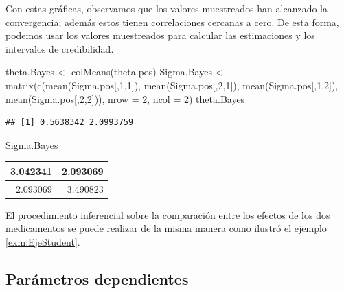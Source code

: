 \documentclass[
  10pt,
  spanish,
]{book}
\newenvironment{Shaded}{\begin{snugshade}}{\end{snugshade}}
\newcommand{\AttributeTok}[1]{\textcolor[rgb]{0.77,0.63,0.00}{#1}}
\newcommand{\DecValTok}[1]{\textcolor[rgb]{0.00,0.00,0.81}{#1}}
\newcommand{\FunctionTok}[1]{\textcolor[rgb]{0.00,0.00,0.00}{#1}}
\newcommand{\NormalTok}[1]{#1}
\newcommand{\OtherTok}[1]{\textcolor[rgb]{0.56,0.35,0.01}{#1}}
\theoremstyle{definition}
\theoremstyle{definition}
\theoremstyle{definition}
\theoremstyle{definition}
\theoremstyle{remark}
\begin{document}
Con estas gráficas, observamos que los valores muestreados han alcanzado la convergencia; además estos tienen correlaciones cercanas a cero. De esta forma, podemos usar los valores muestreados para calcular las estimaciones y los intervalos de credibilidad.

\begin{Shaded}
\begin{Highlighting}[]
\NormalTok{theta.Bayes }\OtherTok{\textless{}{-}} \FunctionTok{colMeans}\NormalTok{(theta.pos)}
\NormalTok{Sigma.Bayes }\OtherTok{\textless{}{-}} \FunctionTok{matrix}\NormalTok{(}\FunctionTok{c}\NormalTok{(}\FunctionTok{mean}\NormalTok{(Sigma.pos[,}\DecValTok{1}\NormalTok{,}\DecValTok{1}\NormalTok{]),}
                        \FunctionTok{mean}\NormalTok{(Sigma.pos[,}\DecValTok{2}\NormalTok{,}\DecValTok{1}\NormalTok{]),}
                        \FunctionTok{mean}\NormalTok{(Sigma.pos[,}\DecValTok{1}\NormalTok{,}\DecValTok{2}\NormalTok{]),}
                        \FunctionTok{mean}\NormalTok{(Sigma.pos[,}\DecValTok{2}\NormalTok{,}\DecValTok{2}\NormalTok{])),}
                      \AttributeTok{nrow =} \DecValTok{2}\NormalTok{, }\AttributeTok{ncol =} \DecValTok{2}\NormalTok{)}
\NormalTok{theta.Bayes}
\end{Highlighting}
\end{Shaded}

\begin{verbatim}
## [1] 0.5638342 2.0993759
\end{verbatim}

\begin{Shaded}
\begin{Highlighting}[]
\NormalTok{Sigma.Bayes}
\end{Highlighting}
\end{Shaded}

\begin{tabular}{r|r}
\hline
3.042341 & 2.093069\\
\hline
2.093069 & 3.490823\\
\hline
\end{tabular}

El procedimiento inferencial sobre la comparación entre los efectos de los dos medicamentos se puede realizar de la misma manera como ilustró el ejemplo \ref{exm:EjeStudent}.

\hypertarget{paruxe1metros-dependientes-1}{%
\subsection{Parámetros dependientes}\label{paruxe1metros-dependientes-1}}
\end{document}
